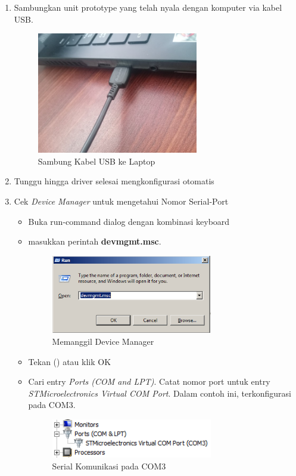 \documentclass{article}
\begin{document}
\begin{enumerate}
		\item Sambungkan unit prototype yang telah nyala dengan komputer via kabel USB.
		\begin{figure}[H]
			\centering
			\includegraphics[width=200pt]{images/pasang/laptop_usb}
			\caption{Sambung Kabel USB ke Laptop}
		\end{figure}

		\item Tunggu hingga driver selesai mengkonfigurasi otomatis

		\item Cek \textit{Device Manager} untuk mengetahui Nomor Serial-Port
		\begin{itemize}
			\item Buka run-command dialog dengan kombinasi keyboard %

			\item masukkan perintah \textbf{devmgmt.msc}.
			\begin{figure}[H]
				\centering
				\includegraphics[width=200pt]{images/software/devicemgr}
				\caption{Memanggil Device Manager}
			\end{figure}

			\item Tekan (\keys{\return}) atau klik OK

			\item Cari entry \textit{Ports (COM and LPT)}.
			Catat nomor port untuk entry \textit{STMicroelectronics Virtual COM Port}.
			Dalam contoh ini, terkonfigurasi pada COM3.

			\begin{figure}[H]
				\centering
				\includegraphics[width=200pt]{images/software/comport}
				\caption{Serial Komunikasi pada COM3}
			\end{figure}
		\end{itemize}



\end{enumerate}
\end{document}

